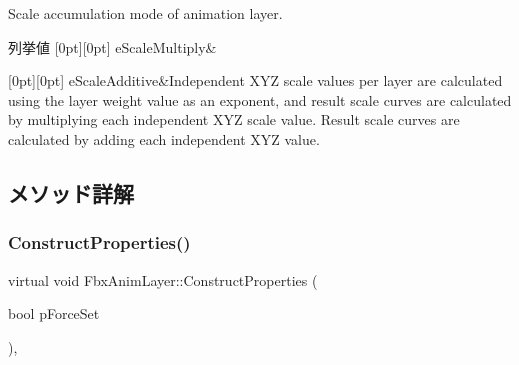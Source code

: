 Scale accumulation mode of animation layer. \begin{DoxyEnumFields}{列挙値}
[0pt][0pt]{}\mbox{\label{class_fbx_anim_layer_aec9cfaa528bee6739ba4317964d123b0af962df864ef1dead2f88ade13f4262d0}} 
e\+Scale\+Multiply&\\
\hline

[0pt][0pt]{}\mbox{\label{class_fbx_anim_layer_aec9cfaa528bee6739ba4317964d123b0a0d79b9c4219c50d434746d7062046123}} 
e\+Scale\+Additive&Independent X\+YZ scale values per layer are calculated using the layer weight value as an exponent, and result scale curves are calculated by multiplying each independent X\+YZ scale value. Result scale curves are calculated by adding each independent X\+YZ value. \\
\hline

\end{DoxyEnumFields}


\subsection{メソッド詳解}
\mbox{\label{class_fbx_anim_layer_a24afc26df98e56c965c0c60e637ed888}} 
\subsubsection{\texorpdfstring{Construct\+Properties()}{ConstructProperties()}}
{\footnotesize\ttfamily virtual void Fbx\+Anim\+Layer\+::\+Construct\+Properties (\begin{DoxyParamCaption}\item[{bool}]{p\+Force\+Set }\end{DoxyParamCaption})\hspace{0.3cm}{\ttfamily [protected]}, {\ttfamily [virtual]}}

